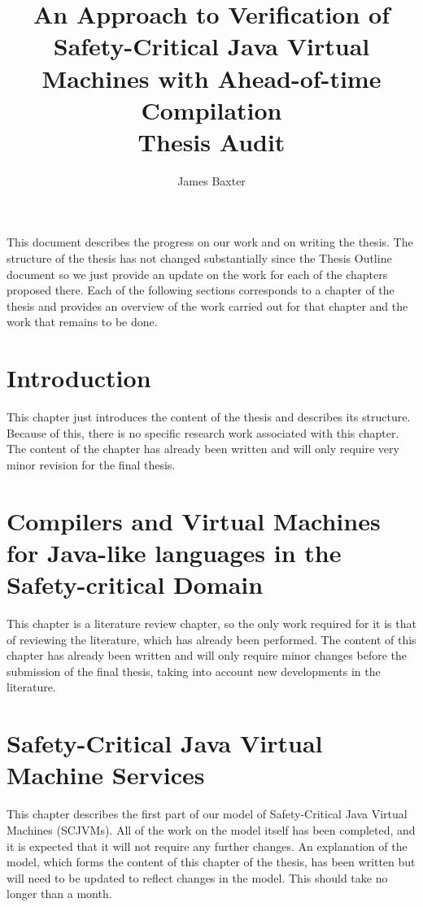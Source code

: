 \documentclass[a4paper,12pt]{article}
\title{An Approach to Verification of Safety-Critical Java Virtual
  Machines with Ahead-of-time Compilation
  \\[1cm]
  \Large Thesis Audit}
\author{James Baxter}
\begin{document}
\maketitle

This document describes the progress on our work and on writing the
thesis. 
The structure of the thesis has not changed substantially since the
Thesis Outline document so we just provide an update on the work for
each of the chapters proposed there. 
Each of the following sections corresponds to a chapter of the thesis
and provides an overview of the work carried out for that chapter and
the work that remains to be done.

\section{Introduction}

This chapter just introduces the content of the thesis and describes
its structure. 
Because of this, there is no specific research work associated with
this chapter. 
The content of the chapter has already been written and will only
require very minor revision for the final thesis.

\section{Compilers and Virtual Machines for Java-like languages in the
  Safety-critical Domain}

This chapter is a literature review chapter, so the only work required
for it is that of reviewing the literature, which has already been
performed.
The content of this chapter has already been written and will only
require minor changes before the submission of the final thesis,
taking into account new developments in the literature.

\section{Safety-Critical Java Virtual Machine Services}

This chapter describes the first part of our model of Safety-Critical
Java Virtual Machines (SCJVMs). 
All of the work on the model itself has been completed, and it is
expected that it will not require any further changes.
An explanation of the model, which forms the content of this chapter
of the thesis, has been written but will need to be updated to reflect
changes in the model.
This should take no longer than a month.
\end{document}
